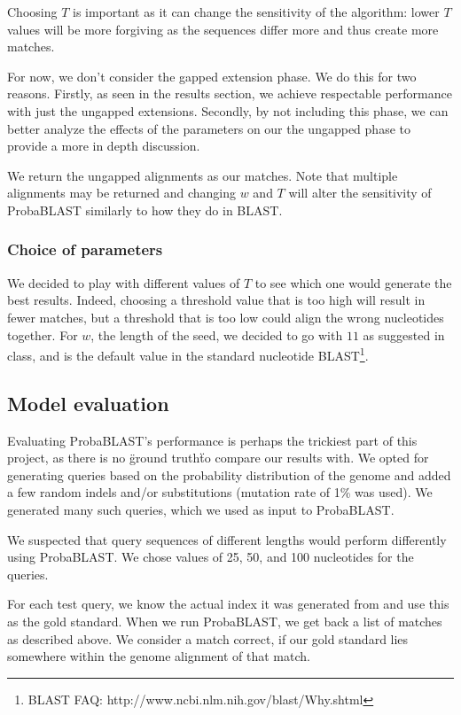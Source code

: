 \documentclass[11pt]{IEEEtran}
\begin{document}
Choosing $T$ is important as it can change the sensitivity of the algorithm: lower $T$ values will be more forgiving as the sequences differ more and thus create more matches.

For now, we don't consider the gapped extension phase. We do this for two reasons. Firstly, as seen in the results section, we achieve respectable performance with just the ungapped extensions. Secondly, by not including this phase, we can better analyze the effects of the parameters on our the ungapped phase to provide a more in depth discussion.

We return the ungapped alignments as our matches. Note that multiple alignments may be returned and changing $w$ and $T$ will alter the sensitivity of ProbaBLAST similarly to how they do in BLAST.

\subsubsection{Choice of parameters}

We decided to play with different values of $T$ to see which one would generate the best results. Indeed, choosing a threshold value that is too high will result in fewer matches, but a threshold that is too low could align the wrong nucleotides together.
For $w$, the length of the seed, we decided to go with $11$ as suggested in class, and is the default value in the standard nucleotide BLAST\footnote{BLAST FAQ: http://www.ncbi.nlm.nih.gov/blast/Why.shtml}.

\subsection{Model evaluation}

Evaluating ProbaBLAST's performance is perhaps the trickiest part of this project, as there is no \"ground truth\" to compare our results with. We opted for generating queries based on the probability distribution of the genome and added a few random indels and/or substitutions (mutation rate of 1\% was used). We generated many such queries, which we used as input to ProbaBLAST.

We suspected that query sequences of different lengths would perform differently using ProbaBLAST. We chose values of 25, 50, and 100 nucleotides for the queries. 

For each test query, we know the actual index it was generated from and use this as the gold standard. When we run ProbaBLAST, we get back a list of matches as described above. We consider a match correct, if our gold standard lies somewhere within the genome alignment of that match.
\end{document}
